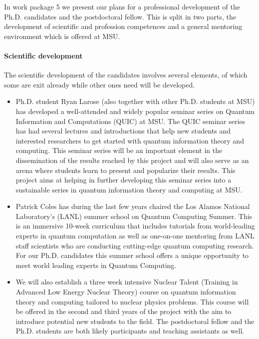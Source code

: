 \documentclass[10pt]{article}
\begin{document}
In work package 5 we present our plans for a professional development of the Ph.D. candidates and the postdoctoral fellow. This is split in two parts, the development of scientific and profession competences and a general mentoring environment which is offered at MSU. 

\paragraph{Scientific development}
The scientific development of the candidates involves several elements, of which some are exit already while other ones need will be developed. 
\begin{itemize}
    \item Ph.D. student Ryan Larose (also together with other Ph.D. students at MSU) has developed a well-attended and widely popular seminar series on Quantum Information and Computations (QUIC) at MSU. The QUIC seminar series has had  several lectures and introductions that help new students and interested researchers to get started with quantum information theory and computing. This seminar series will be an important element in the dissemination of the results reached by this project and will also serve as an arena where students learn to present and popularize their results.  This project aims at helping in further developing this seminar series into a sustainable series in quantum information theory and computing at MSU. 
    \item Patrick Coles has during the last few years chaired the Los Alamos National Laboratory's (LANL) summer school on Quantum Computing Summer. This is an immersive 10-week curriculum that includes tutorials from world-leading experts in quantum computation as well as one-on-one mentoring from LANL staff scientists who are conducting cutting-edge quantum computing research. For our Ph.D. candidates this summer school offers a unique opportunity to meet world leading experts in Quantum Computing. 
    \item We will also establish a three week intensive Nuclear Talent (Training in Advanced Low Energy Nuclear Theory) course on quantum information theory and computing tailored to nuclear physics problems. This course will be offered in the second and third years of the project with the aim to introduce potential new students to the field. The postdoctoral fellow and the Ph.D. students are both likely participants and teaching assistants as well.

\end{itemize}
\end{document}
